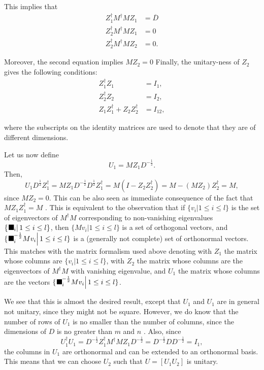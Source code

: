 \documentclass[aps,preprint]{revtex4}%
\providecommand{\U}[1]{\protect\rule{.1in}{.1in}}
\begin{document}
This implies that%
\begin{align}
Z_{1}^{\dagger}M^{\dagger}MZ_{1}  &  =\overline{D}\\
Z_{2}^{\dagger}M^{\dagger}MZ_{1}  &  =0\\
Z_{2}^{\dagger}M^{\dagger}MZ_{2}  &  =0.
\end{align}


Moreover, the second equation implies $MZ_{2}=0$ Finally, the unitary-ness of
$Z_{2}$ gives the following conditions:%
\begin{align}
Z_{1}^{\dagger}Z_{1}  &  =I_{1},\\
Z_{2}^{\dagger}Z_{2}  &  =I_{2},\\
Z_{1}Z_{1}^{\dagger}+Z_{2}Z_{2}^{\dagger}  &  =I_{12},
\end{align}


where the subscripts on the identity matrices are used to denote that they are
of different dimensions.

Let us now define%
\begin{equation}
U_{1}=MZ_{1}D^{-\frac{1}{2}}.
\end{equation}
Then,%
\begin{equation}
U_{1}D^{\frac{1}{2}}Z_{1}^{\dagger}=MZ_{1}D^{-\frac{1}{2}}D^{\frac{1}{2}}%
Z_{1}^{\dagger}=M(I-Z_{2}Z_{2}^{\dagger})=M-(MZ_{2})Z_{2}^{\dagger}=M,
\end{equation}
since $MZ_{2}=0$. This can be also seen as immediate consequence of the fact
that $MZ_{1}Z_{1}^{\dagger}=M$ . This is equivalent to the observation that if
$\{\left.  v_{i}\right\vert 1\leq i\leq l\}$ is the set of eigenvectors of
$M^{\dagger}M$ corresponding to non-vanishing eigenvalues $\{\left.  \U{3bb}
_{i}\right\vert 1\leq i\leq l\}$, then $\{\left.  Mv_{i}\right\vert 1\leq
i\leq l\}$ is a set of orthogonal vectors, and $\{\left.  \U{3bb} _{i}%
^{-\frac{1}{2}}Mv_{i}\right\vert 1\leq i\leq l\}$ is a (generally not
complete) set of orthonormal vectors. This matches with the matrix formalism
used above denoting with $Z_{1}$ the matrix whose columns are $\{\left.
v_{i}\right\vert 1\leq i\leq l\}$, with $Z_{2}$ the matrix whose columns are
the eigenvectors of $M^{\dagger}M$ with vanishing eigenvalue, and $U_{1}$ the
matrix whose columns are the vectors $\{\left.  \U{3bb} _{i}^{-\frac{1}{2}%
}Mv_{i}\right\vert 1\leq i\leq l\}$.

We see that this is almost the desired result, except that $U_{1}$ and $U_{1}$
are in general not unitary, since they might not be square. However, we do
know that the number of rows of $U_{1}$ is no smaller than the number of
columns, since the dimensions of $D$ is no greater than $m$ and $n$ . Also,
since%
\begin{equation}
U_{1}^{\dagger}U_{1}=D^{-\frac{1}{2}}Z_{1}^{\dagger}M^{\dagger}MZ_{1}%
D^{-\frac{1}{2}}=D^{-\frac{1}{2}}DD^{-\frac{1}{2}}=I_{1},
\end{equation}
the columns in $U_{1}$ are orthonormal and can be extended to an orthonormal
basis. This means that we can choose $U_{2}$ such that $U=[U_{1}U_{2}]$ is unitary.
\end{document}
